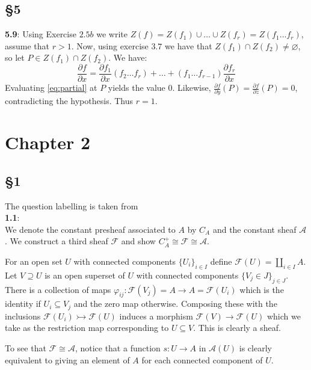 \documentclass[12pt]{article}
\numberwithin{thm}{subsection}
\numberwithin{defn}{subsection}
\numberwithin{lemma}{subsection}
\numberwithin{example}{subsection}
\numberwithin{notation}{subsection}
\numberwithin{cor}{subsection}
\numberwithin{remark}{subsection}
\numberwithin{condition}{subsection}
\numberwithin{question}{subsection}
\numberwithin{construction}{subsection}
\numberwithin{construction}{subsection}
\numberwithin{construction}{subsection}
\newcommand{\scr}[1]{\mathscr{#1}}
\begin{document}
\subsection{\S 5}
\textbf{5.9}: Using Exercise $2.5b$ we write $Z(f) = Z(f_1) \cup \hdots \cup Z(f_r) = Z(f_1...f_r)$, assume that $r > 1$. Now, using exercise $3.7$ we have that $Z(f_1) \cap Z(f_2) \neq \varnothing$, so let $P \in Z(f_1) \cap Z(f_2)$. We have:
\begin{equation}\label{eq:partial}
\frac{\partial f}{\partial x} = \frac{\partial f_1}{\partial x}(f_2\hdots f_r) + \hdots + (f_1\hdots f_{r-1})\frac{\partial f_r}{\partial x}
\end{equation}
Evaluating \eqref{eq:partial} at $P$ yields the value $0$. Likewise, $\frac{\partial f}{\partial y}(P) = \frac{\partial f}{\partial z}(P) = 0$, contradicting the hypothesis. Thus $r = 1$.
\section{Chapter 2}
\subsection{\S 1}
The question labelling is taken from \cite[II \S 1]{hartshorne}\\
\textbf{1.1}:\\
%
We denote the constant presheaf associated to $A$ by $C_A$ and the constant sheaf $\scr{A}$. We construct a third sheaf $\scr{F}$ and show $C_A^+ \cong \scr{F} \cong \scr{A}$.

For an open set $U$ with connected components $\lbrace U_i \rbrace_{i \in I}$ define $\scr{F}(U) = \coprod_{i \in I}A$. Let $V \supseteq U$ is an open superset of $U$ with connected components $\lbrace V_j \in J\rbrace_{j \in J}$. There is a collection of maps $\varphi_{ij}: \scr{F}(V_j) = A \to A = \scr{F}(U_i)$ which is the identity if $U_i \subseteq V_j$ and the zero map otherwise. Composing these with the inclusions $\scr{F}(U_i) \rightarrowtail \scr{F}(U)$ induces a morphism $\scr{F}(V) \to \scr{F}(U)$ which we take as the restriction map corresponding to $U \subseteq V$. This is clearly a sheaf.

To see that $\scr{F} \cong \scr{A}$, notice that a function $s: U \to A$ in $\scr{A}(U)$ is clearly equivalent to giving an element of $A$ for each connected component of $U$.
\end{document}
